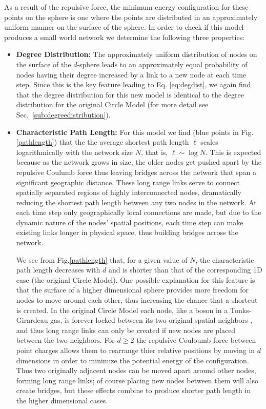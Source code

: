 \documentclass[aps,pre,manuscript,superscriptaddress,amsmath,amssymb,nofootinbib]{revtex4-1}
\begin{document}
As a result of the repulsive force, the minimum energy configuration for these points on the sphere is one where the points are distributed in an approximately uniform manner on the surface of the sphere.
In order to check if this model produces a small world network we determine the following three properties:
\begin{itemize}
  \item \textbf{Degree Distribution:} The approximately uniform distribution of nodes on the surface of the $d$-sphere leads to an approximately equal probability of nodes having their degree increased by a link to a new node at each time step.
Since this is the key feature leading to Eq. \eqref{eq:degdist}, we again find that the degree distribution for this new model is identical to the degree distribution for the original Circle Model (for more detail see Sec.~\ref{sub:degreedistribution}).
  \item \textbf{Characteristic Path Length:} For this model we find (blue points in Fig.\ref{pathlength}) that the the average shortest path length $\ell$ scales logarithmically with the network size $N$, that is, $\ell \sim \log N$. 
This is expected because as the network grows in size, the older nodes get pushed apart by the repulsive Coulumb force thus leaving bridges across the network that span a significant geographic distance.
These long range links serve to connect spatially separated regions of highly interconnected nodes, dramatically reducing the shortest path length between any two nodes in the network.
At each time step only geographically local connections are made, but due to the dynamic nature of the nodes' spatial positions, each time step can make existing links longer in physical space, thus building bridges across the network.

\indent
We see from Fig.\ref{pathlength} that, for a given value of $N$, the characteristic path length decreases with $d$ and is shorter than that of the corresponding 1D case (the original Circle Model).
One possible explanation for this feature is that the surface of a higher dimensional sphere provides more freedom for nodes to move around each other, thus increasing the chance that a shortcut is created.
In the original Circle Model each node, like a boson in a Tonks-Girardeau gas, is forever locked between its two original spatial neighbors \cite{girardeau}, and thus long range links can only be created if new nodes are placed between the two neighbors.
For $d \geq 2$ the repulsive Couloumb force between point charges allows them to rearrange thier relative positions by moving in $d$ dimensions in order to minimize the potential energy of the configuration.
Thus two originally adjacent nodes can be moved apart around other nodes, forming long range links; of course placing new nodes between them will also create bridges, but these effects combine to produce shorter path length in the higher dimensional cases.


\end{itemize}
\end{document}
